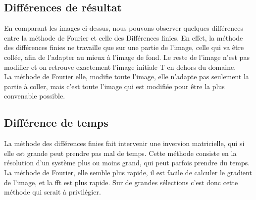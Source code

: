 \newpage 
\subsection{Différences de résultat}
En comparant les images ci-dessus, nous pouvons observer quelques différences entre la méthode de Fourier et celle des Différences finies. En effet, la méthode des différences finies ne travaille que sur une partie de l'image, celle qui va être collée, afin de l'adapter au mieux à l'image de fond. Le reste de l'image n'est pas modifier et on retrouve exactement l'image initiale T en dehors du domaine. \\
La méthode de Fourier elle, modifie toute l'image, elle n'adapte pas seulement la partie à coller, mais c'est toute l'image qui est modifiée pour être la plus convenable possible.  \\
\subsection{Différence de temps}
La méthode des différences finies fait intervenir une inversion matricielle, qui si elle est grande peut prendre pas mal de temps. Cette méthode consiste en la résolution d'un système plus ou moins grand, qui peut parfois prendre du temps. \\
La méthode de Fourier, elle semble plus rapide, il est facile de calculer le gradient de l'image, et la fft est plus rapide. Sur de grandes sélections c'est donc cette méthode qui serait à privilégier. 